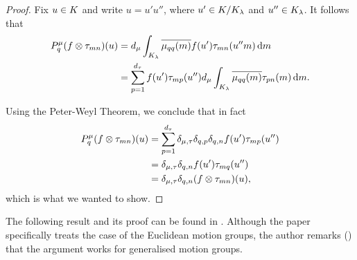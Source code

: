 \begin{proof}
    Fix $u \in K$ and write $u = u' u''$,
    where $u' \in {{K} \slash{} {{{K}_{\lambda}}}}$
    and $u'' \in {{K}_{\lambda}}$.
    It follows that
    \begin{align*}
        P^\mu_q (f \otimes \tau_{m n}) (u)
        &= {d_{\mu}}
            \int_{{K}_{\lambda}}
                \overline{\mu_{q q}(m)}
                f(u')
                \tau_{m n}(u'' m)
            \,\mathrm{d} m\\
        &= \sum_{p = 1}^{d_{\tau}}
                f(u')
                \tau_{m p}(u'')
                {d_{\mu}}
                \int_{{K}_{\lambda}}
                    \overline{\mu_{q q}(m)}
                    \tau_{p n}(m)
                \,\mathrm{d} m.
    \end{align*}

    Using the Peter-Weyl Theorem, we conclude that in fact
    \begin{align*}
        P^\mu_q (f \otimes \tau_{m n}) (u)
        &= \sum_{p = 1}^{d_{\tau}}
            \delta_{\mu,\tau}
            \delta_{q,p}
            \delta_{q,n}
            f(u')
            \tau_{m p}(u'')\\
        &= \delta_{\mu,\tau}
            \delta_{q,n}
            f(u')
            \tau_{m q}(u'')\\
        &= \delta_{\mu,\tau}
            \delta_{q,n}
            (f \otimes \tau_{m n})(u),
    \end{align*}
    which is what we wanted to show.
\end{proof}

The following result and its proof can be found in \cite[Theorem 1.1, 1.2, 1.3]{Ito52}.
Although the paper specifically treats the case of the Euclidean motion groups,
the author remarks (\cite[Remark p. 84]{Ito52}) that the argument works for generalised motion groups.

